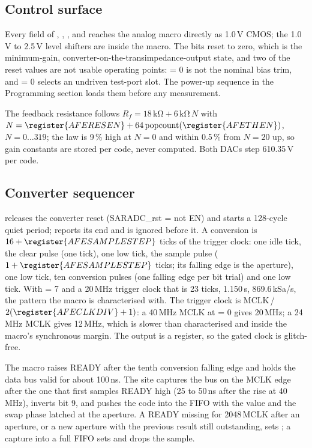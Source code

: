 \subsection{Control surface}

Every field of , , ,  and  reaches the analog macro directly as 1.0\,V CMOS; the 1.0\,V to 2.5\,V level shifters are inside the macro. The bits reset to zero, which is the minimum-gain, converter-on-the-transimpedance-output state, and two of the reset values are not usable operating points:  = 0 is not the nominal bias trim, and  = 0 selects an undriven test-port slot. The power-up sequence in the Programming section loads them before any measurement.

The feedback resistance follows $R_f = 18\,\mathrm{k\Omega} + 6\,\mathrm{k\Omega}\,N$ with $N = \register{AFERESEN} + 64\,\mathrm{popcount}(\register{AFETHEN})$, $N = 0 \ldots 319$; the law is 9\,\% high at $N = 0$ and within 0.5\,\% from $N = 20$ up, so gain constants are stored per code, never computed. Both DACs step 610.35\,\textmu V per code.

\subsection{Converter sequencer}

 releases the converter reset (SARADC\_rst = not EN) and starts a 128-cycle quiet period;  reports its end and  is ignored before it. A conversion is $16 + \register{AFESAMPLESTEP}$ ticks of the trigger clock: one idle tick, the clear pulse (one tick), one low tick, the sample pulse ($1 + \register{AFESAMPLESTEP}$ ticks; its falling edge is the aperture), one low tick, ten conversion pulses (one falling edge per bit trial) and one low tick. With  = 7 and a 20\,MHz trigger clock that is 23 ticks, 1.150\,\textmu s, 869.6\,kSa/s, the pattern the macro is characterised with. The trigger clock is MCLK\,/\,$2(\register{AFECLKDIV}+1)$: a 40\,MHz MCLK at  = 0 gives 20\,MHz; a 24\,MHz MCLK gives 12\,MHz, which is slower than characterised and inside the macro's synchronous margin. The output is a register, so the gated clock is glitch-free.

The macro raises READY after the tenth conversion falling edge and holds the data bus valid for about 100\,ns. The site captures the bus on the MCLK edge after the one that first samples READY high (25 to 50\,ns after the rise at 40\,MHz), inverts bit 9, and pushes the code into the FIFO with the  value and the swap phase latched at the aperture. A READY missing for 2048\,MCLK after an aperture, or a new aperture with the previous result still outstanding, sets ; a capture into a full FIFO sets  and drops the sample.

